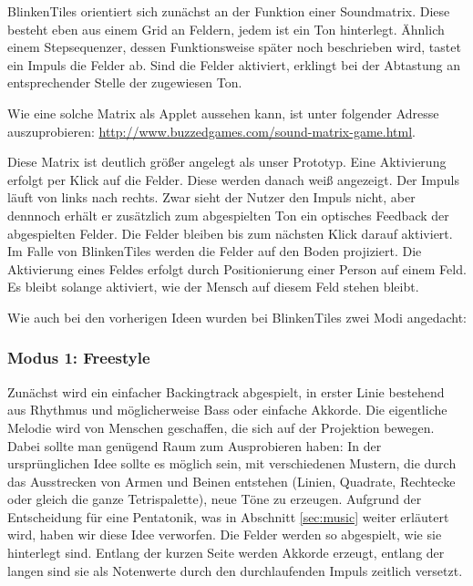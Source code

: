 
BlinkenTiles orientiert sich zunächst an der Funktion einer Soundmatrix. Diese besteht eben aus einem Grid an Feldern, jedem ist ein Ton hinterlegt. Ähnlich einem Stepsequenzer, dessen Funktionsweise später noch beschrieben wird, tastet ein Impuls die Felder ab. Sind die Felder aktiviert, erklingt bei der Abtastung an entsprechender Stelle der zugewiesen Ton.

Wie eine solche Matrix als Applet aussehen kann, ist unter folgender Adresse auszuprobieren: \url{http://www.buzzedgames.com/sound-matrix-game.html}.

Diese Matrix ist deutlich größer angelegt als unser Prototyp. Eine Aktivierung erfolgt per Klick auf die Felder. Diese werden danach weiß angezeigt. Der Impuls läuft von links nach rechts. Zwar sieht der Nutzer den Impuls nicht, aber dennnoch erhält er zusätzlich zum abgespielten Ton ein optisches Feedback der abgespielten Felder. Die Felder bleiben bis zum nächsten Klick darauf aktiviert.\\
Im Falle von BlinkenTiles werden die Felder auf den Boden projiziert. Die Aktivierung eines Feldes erfolgt durch Positionierung einer Person auf einem Feld. Es bleibt solange aktiviert, wie der Mensch auf diesem Feld stehen bleibt.

Wie auch bei den vorherigen Ideen wurden bei BlinkenTiles zwei Modi angedacht:

\subsubsection{Modus 1: Freestyle}

Zunächst wird ein einfacher Backingtrack abgespielt, in erster Linie bestehend aus Rhythmus und möglicherweise Bass oder einfache Akkorde. Die eigentliche Melodie wird von Menschen geschaffen, die sich auf der Projektion bewegen. Dabei sollte man genügend Raum zum Ausprobieren haben: In der ursprünglichen Idee sollte es möglich sein, mit verschiedenen Mustern, die durch das Ausstrecken von Armen und Beinen entstehen (Linien, Quadrate, Rechtecke oder gleich die ganze Tetrispalette), neue Töne zu erzeugen. Aufgrund der Entscheidung für eine Pentatonik, was in Abschnitt \ref{sec:music} weiter erläutert wird, haben wir diese Idee verworfen. Die Felder werden so abgespielt, wie sie hinterlegt sind. Entlang der kurzen Seite werden Akkorde erzeugt, entlang der langen sind sie als Notenwerte durch den durchlaufenden Impuls zeitlich versetzt.

